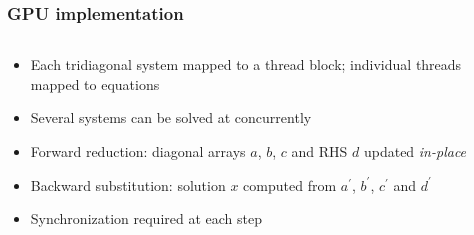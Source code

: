 \documentclass[10pt]{beamer}
\begin{document}
\begin{frame}
\frametitle{GPU implementation}
\begin{columns}
\begin{column}{0.5\textwidth}
\begin{itemize}
\item Each tridiagonal system mapped to a thread block;
    individual threads mapped to equations
\item Several systems can be solved at concurrently
\item Forward reduction: diagonal arrays $a$, $b$, $c$ and RHS $d$
    updated \emph{in-place}
\item Backward substitution: solution $x$ computed
    from $a^\prime$, $b^\prime$, $c^\prime$ and $d^\prime$
\item Synchronization required at each step
\end{itemize}
\end{column}
\begin{column}{0.5\textwidth}

\end{column}
\end{columns}
\end{frame}
\end{document}
